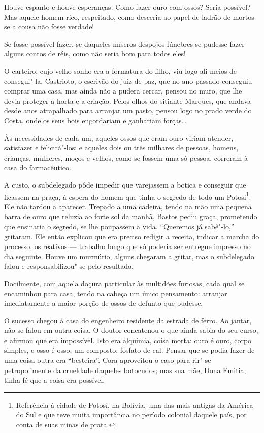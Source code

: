 Houve espanto e houve esperanças. Como fazer ouro com ossos? Seria
possível? Mas aquele homem rico, respeitado, como desceria ao papel de
ladrão de mortos se a cousa não fosse verdade!

Se fosse possível fazer, se daqueles míseros despojos fúnebres se
pudesse fazer alguns contos de réis, como não seria bom para todos eles!

O carteiro, cujo velho sonho era a formatura do filho, viu logo ali
meios de consegui"-la. Castrioto, o escrivão do juiz de paz, que no ano
passado conseguiu comprar uma casa, mas ainda não a pudera cercar,
pensou no muro, que lhe devia proteger a horta e a criação. Pelos olhos
do sitiante Marques, que andava desde anos atrapalhado para arranjar um
pasto, pensou logo no prado verde do Costa, onde os seus bois
engordariam e ganhariam forças\ldots{}

Às necessidades de cada um, aqueles ossos que eram ouro viriam atender,
satisfazer e felicitá"-los; e aqueles dois ou três milhares de pessoas,
homens, crianças, mulheres, moços e velhos, como se fossem uma só
pessoa, correram à casa do farmacêutico.

A custo, o subdelegado pôde impedir que varejassem a botica e conseguir
que ficassem na praça, à espera do homem que tinha o segredo de todo um
Potosi\footnote{Referência à cidade de Potosí, na Bolívia, uma das mais
  antigas da América do Sul e que teve muita importância no período
  colonial daquele país, por conta de suas minas de prata.}. Ele não
tardou a aparecer. Trepado a uma cadeira, tendo na mão uma pequena barra
de ouro que reluzia ao forte sol da manhã, Bastos pediu graça,
prometendo que ensinaria o segredo, se lhe poupassem a vida. ``Queremos
já sabê"-lo,'' gritaram. Ele então explicou que era preciso redigir a
receita, indicar a marcha do processo, os reativos --- trabalho longo
que só poderia ser entregue impresso no dia seguinte. Houve um murmúrio,
alguns chegaram a gritar, mas o subdelegado falou e responsabilizou"-se
pelo resultado.

Docilmente, com aquela doçura particular às multidões furiosas, cada
qual se encaminhou para casa, tendo na cabeça um único pensamento:
arranjar imediatamente a maior porção de ossos de defunto que pudesse.

O sucesso chegou à casa do engenheiro residente da estrada de ferro. Ao
jantar, não se falou em outra coisa. O doutor concatenou o que ainda
sabia do seu curso, e afirmou que era impossível. Isto era alquimia,
coisa morta: ouro é ouro, corpo simples, e osso é osso, um composto,
fosfato de cal. Pensar que se podia fazer de uma coisa outra era
``besteira''. Cora aproveitou o caso para rir"-se petropolimente da
crueldade daqueles botocudos; mas sua mãe, Dona Emitia, tinha fé que a
coisa era possível.

